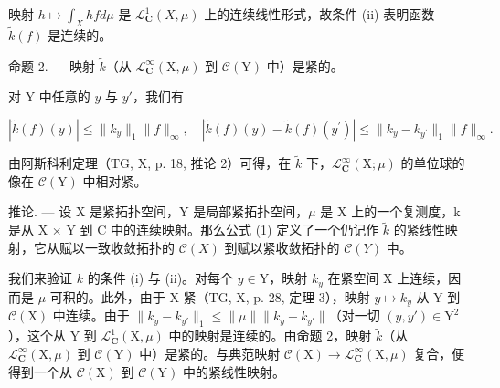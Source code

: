 映射 \(h \mapsto \int_{X} hfd\mu\) 是 \(\mathcal{L}_{\mathbf{C}}^{1}(X,\mu)\) 上的连续线性形式，故条件 (ii) 表明函数 \(\widetilde{k}(f)\) 是连续的。

命题 2. — 映射 \(\widetilde{k}\)（从 \(\mathcal{L}_{\mathbf{C}}^{\infty}(\mathrm{X},\mu)\) 到 \(\mathcal{C}(\mathrm{Y})\) 中）是紧的。

对 Y 中任意的 \(y\) 与 \(y'\)，我们有

\[
| \widetilde {k} (f) (y) | \leqslant \| k _ {y} \| _ {1} \| f \| _ {\infty}, \quad | \widetilde {k} (f) (y) - \widetilde {k} (f) (y ^ {\prime}) | \leqslant \| k _ {y} - k _ {y ^ {\prime}} \| _ {1} \| f \| _ {\infty}.
\]

由阿斯科利定理（TG, X, p. 18, 推论 2）可得，在 \(\widetilde{k}\) 下，\(\mathcal{L}_{\mathbf{C}}^{\infty}(\mathrm{X};\mu)\) 的单位球的像在 \(\mathcal{C}(\mathrm{Y})\) 中相对紧。

推论. --- 设 X 是紧拓扑空间，Y 是局部紧拓扑空间，\(\mu\) 是 X 上的一个复测度，k 是从 X × Y 到 C 中的连续映射。那么公式 (1) 定义了一个仍记作 \(\widetilde{k}\) 的紧线性映射，它从赋以一致收敛拓扑的 \(\mathcal{C}(X)\) 到赋以紧收敛拓扑的 \(\mathcal{C}(Y)\) 中。

我们来验证 \(k\) 的条件 (i) 与 (ii)。对每个 \(y \in \mathrm{Y}\)，映射 \(k_y\) 在紧空间 X 上连续，因而是 \(\mu\) 可积的。此外，由于 X 紧（TG, X, p. 28, 定理 3），映射 \(y \mapsto k_y\) 从 Y 到 \(\mathcal{C}(\mathrm{X})\) 中连续。由于 \(\| k_y - k_{y'} \|_1 \leqslant \| \mu \| \| k_y - k_{y'} \|\)（对一切 \((y, y') \in \mathrm{Y}^2\)），这个从 Y 到 \(\mathcal{L}_{\mathbf{C}}^1(\mathrm{X}, \mu)\) 中的映射是连续的。由命题 2，映射 \(\widetilde{k}\)（从 \(\mathcal{L}_{\mathbf{C}}^\infty(\mathrm{X}, \mu)\) 到 \(\mathcal{C}(\mathrm{Y})\) 中）是紧的。与典范映射 \(\mathcal{C}(\mathrm{X}) \to \mathcal{L}_{\mathbf{C}}^\infty(\mathrm{X}, \mu)\) 复合，便得到一个从 \(\mathcal{C}(\mathrm{X})\) 到 \(\mathcal{C}(\mathrm{Y})\) 中的紧线性映射。